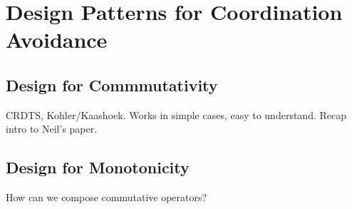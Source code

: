 \documentclass{sig-alternate}
\begin{document}
\section{Design Patterns for Coordination Avoidance}
\label{sec:patterns}

\subsection{Design for Commmutativity}
CRDTS, Kohler/Kaashoek.  Works in simple cases, easy to understand.  Recap intro to Neil's paper.
\subsection{Design for Monotonicity}
How can we compose commutative operators?  



\end{document}
